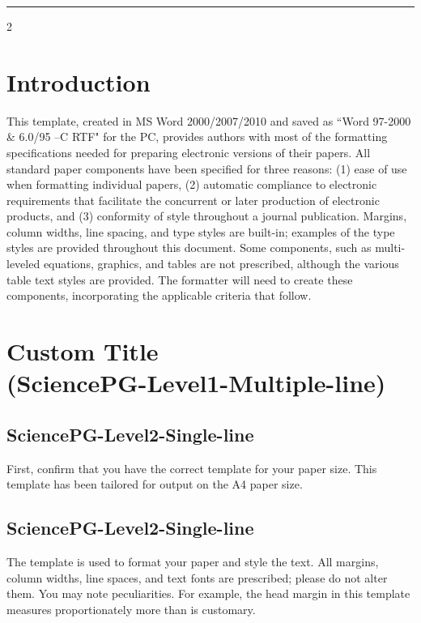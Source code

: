 \documentclass{book}
\theoremstyle{remark}
\begin{document}
\noindent \rule{\textwidth}{1pt}
\parskip=0pt
\columnseprule=0pt
\setlength{\columnsep}{1.5em}
\vspace{-12pt}
\begin{multicols}{2}
\section{Introduction}
\vspace{-6pt}
This template, created in MS Word 2000/2007/2010 and saved as ``Word 97-2000 \& 6.0/95 --C RTF" for the PC, provides authors with most of the formatting specifications needed for preparing electronic versions of their papers. All standard paper components have been specified for three reasons: (1) ease of use when formatting individual papers, (2) automatic compliance to electronic requirements that facilitate the concurrent or later production of electronic products, and (3) conformity of style throughout a journal publication. Margins, column widths, line spacing, and type styles are built-in; examples of the type styles are provided throughout this document. Some components, such as multi-leveled equations, graphics, and tables are not prescribed, although the various table text styles are provided. The formatter will need to create these components, incorporating the applicable criteria that follow.

\section{Custom Title\\(SciencePG-Level1-Multiple-line)}

\subsection{SciencePG-Level2-Single-line}
First, confirm that you have the correct template for your paper size. This template has been tailored for output on the A4 paper size.

\subsection{SciencePG-Level2-Single-line}
The template is used to format your paper and style the text. All margins, column widths, line spaces, and text fonts are prescribed; please do not alter them. You may note peculiarities. For example, the head margin in this template measures proportionately more than is customary.


\end{multicols}
\end{document}
